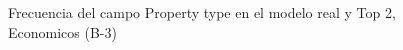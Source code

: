 \begin{figure}[H]
    \centering
    
    \caption{Frecuencia del campo Property type en el modelo real y Top 2, Economicos (B-3)}
    \label{frecuency-Property Type-top2}
\end{figure}
